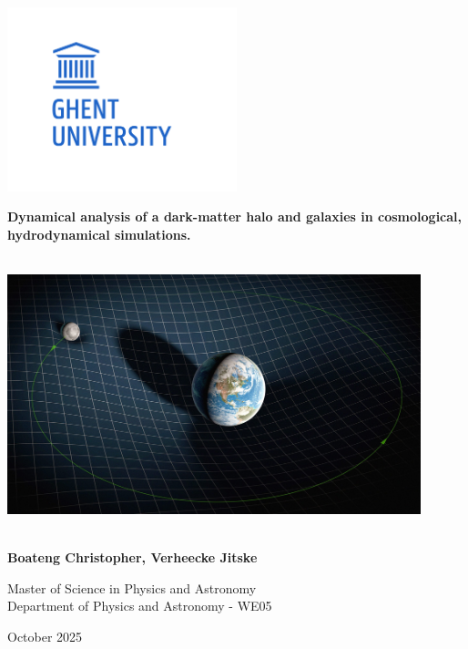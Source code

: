 \begin{titlepage}
    \begin{center}
        \includegraphics[width=0.5\textwidth]{images/logo_UGent_EN_RGB_2400_color.png}
        
        \huge 
        
        \Huge
        \textbf{Dynamical analysis of a dark-matter halo and galaxies in cosmological, hydrodynamical simulations.}
        
        \vspace{0.2cm}
        \includegraphics[width=12cm, height = 8cm]{images/Gravity-9b985a4-scaled.jpg}
        
        \vspace{0.2cm}
        \Large
        \textbf{Boateng Christopher, Verheecke Jitske}
        
        \vspace{0.5cm}
        \normalsize
        Master of Science in Physics and Astronomy\\
        
        \vspace{0.5cm}
        \large Department of Physics and Astronomy - WE05
        
        \vspace{0.1cm}
        \large October 2025
    \end{center}
\end{titlepage}

